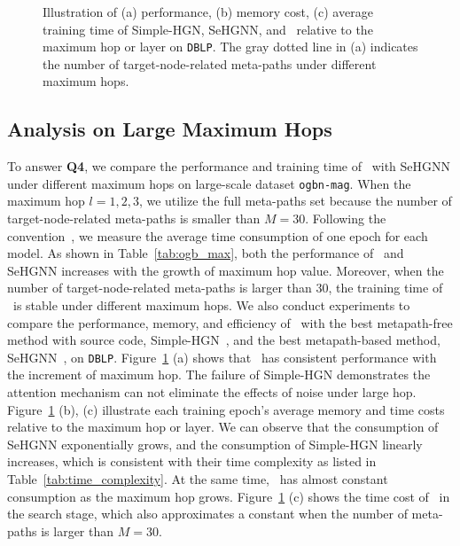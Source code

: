 \begin{figure}[!t]
\footnotesize
\centering
{}
\vspace{1.2pt}
\hspace{0.3em}
\hspace{0.3em}
\vspace{-3pt}
\caption{ Illustration of 
(a) performance, (b) memory cost, (c) average training time of Simple-HGN, SeHGNN, and \model~relative to the maximum hop or layer on \texttt{DBLP}. The gray dotted line in (a) indicates the number of target-node-related meta-paths under different maximum hops.  
}
\label{fig:largehop}
\vspace{-3pt}
\end{figure} \subsection{Analysis on Large Maximum Hops}





To answer \textbf{Q4}, we compare the performance and training time of \model~with SeHGNN under different maximum hops on large-scale dataset \texttt{ogbn-mag}. When the maximum hop $l=1,2,3$, we utilize the full meta-paths set because the number of target-node-related meta-paths is smaller than $M=30$. 
Following the convention~\citep{lv2021we,yang2022simple}, we measure the average time consumption of one epoch for each model. As shown in Table~\ref{tab:ogb_max}, both the performance of \model~and SeHGNN increases with the growth of maximum hop value.   
Moreover, when the number of target-node-related meta-paths is larger than $30$, the training time of \model~is stable under different maximum hops. 
We also conduct experiments to compare the performance, memory, and efficiency of \model~with the best metapath-free method with source code, Simple-HGN~\citep{lv2021we}, and the best metapath-based method, SeHGNN~\citep{yang2022simple}, on \texttt{DBLP}. Figure~\ref{fig:largehop} (a) shows that \model~has consistent performance with  the increment of maximum hop. 
The failure of Simple-HGN demonstrates the attention mechanism can not eliminate the effects of noise under large hop. 
Figure~\ref{fig:largehop} (b), (c) illustrate each training epoch's average memory and time costs relative to the maximum hop or layer. 
We can observe that the consumption of SeHGNN exponentially grows, and the consumption of Simple-HGN linearly increases, which is consistent with their time complexity as listed in Table~\ref{tab:time_complexity}. At the same time, \model~has almost constant consumption as the maximum hop grows. Figure~\ref{fig:largehop} (c) shows the time cost of \model~in the search stage, which also approximates a constant when the number of meta-paths is larger than $M=30$. 



